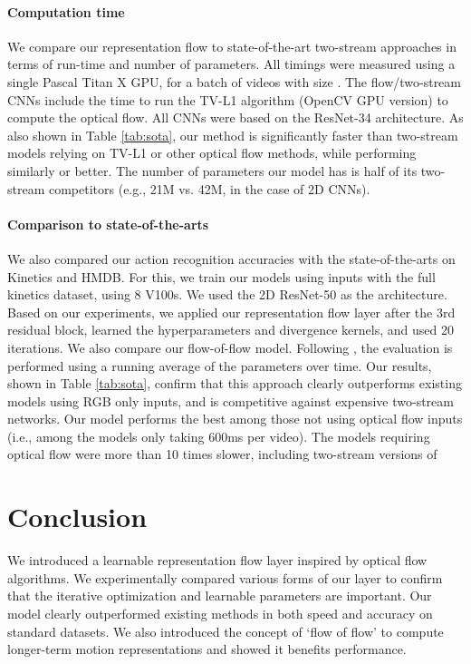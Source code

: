 \documentclass[10pt,twocolumn,letterpaper]{article}
\begin{document}
\vspace{-3pt}
\paragraph{Computation time} We compare our representation flow to state-of-the-art two-stream approaches in terms of run-time and number of parameters.
All timings were measured using a single Pascal Titan X GPU, for a batch of videos with size . 
The flow/two-stream CNNs include the time to run the TV-L1 algorithm (OpenCV GPU version) to compute the optical flow. All CNNs were based on the ResNet-34 architecture. As also shown in Table \ref{tab:sota}, our method is significantly faster than two-stream models relying on TV-L1 or other optical flow methods, while performing similarly or better. The number of parameters our model has is half of its two-stream competitors (e.g., 21M vs. 42M, in the case of 2D CNNs).




\vspace{-3pt}
\paragraph{Comparison to state-of-the-arts} We also compared our action recognition accuracies with the state-of-the-arts on Kinetics and HMDB. For this, we train our models using  inputs with the full kinetics dataset, using 8 V100s. We used the 2D ResNet-50 as the architecture. Based on our experiments, we applied our representation flow layer after the 3rd residual block, learned the hyperparameters and divergence kernels, and used 20 iterations. We also compare our flow-of-flow model. Following \cite{szegedy2016rethinking}, the evaluation is performed using a running average of the parameters over time. Our results, shown in Table \ref{tab:sota}, confirm that this approach clearly outperforms existing models using RGB only inputs, and is competitive against expensive two-stream networks. Our model performs the best among those not using optical flow inputs (i.e., among the models only taking 600ms per video). The models requiring optical flow were more than 10 times slower, including two-stream versions of \cite{carreira2017quo,wang2017non,xie2017rethinking}



\section{Conclusion}
We introduced a learnable representation flow layer inspired by optical flow algorithms. We experimentally compared various forms of our layer to confirm that the iterative optimization and learnable parameters are important. Our model clearly outperformed existing methods in both speed and accuracy on standard datasets. We also introduced the concept of `flow of flow' to compute longer-term motion representations and showed it benefits performance.
\end{document}
